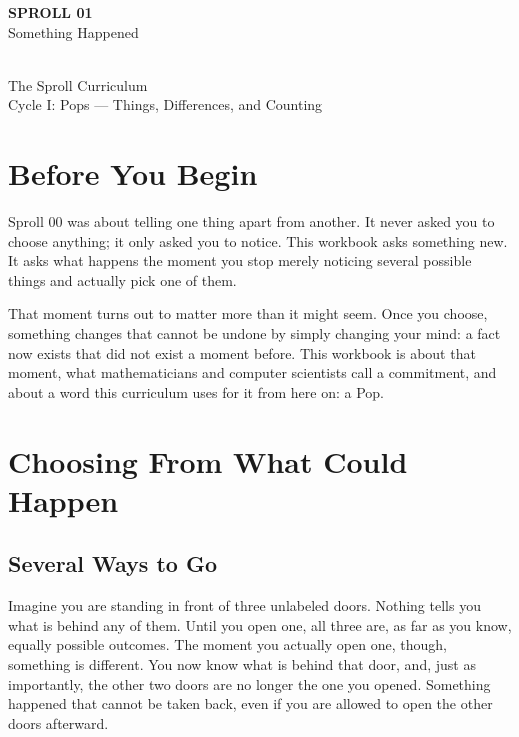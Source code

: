 \documentclass[11pt]{book}
\begin{document}
\begin{titlepage}
\centering
\vspace*{1.4in}
{\Huge \textbf{SPROLL 01}}\\[0.5in]
{\huge Something Happened}\\[0.8in]
\\[0.8in]
{\Large The Sproll Curriculum}\\[0.2in]
{\large Cycle I: Pops --- Things, Differences, and Counting}
\end{titlepage}

\tableofcontents

\chapter*{Before You Begin}

Sproll 00 was about telling one thing apart from another. It never asked you to choose anything; it only asked you to notice. This workbook asks something new. It asks what happens the moment you stop merely noticing several possible things and actually pick one of them.

That moment turns out to matter more than it might seem. Once you choose, something changes that cannot be undone by simply changing your mind: a fact now exists that did not exist a moment before. This workbook is about that moment, what mathematicians and computer scientists call a commitment, and about a word this curriculum uses for it from here on: a Pop.

\chapter{Choosing From What Could Happen}

\section{Several Ways to Go}

Imagine you are standing in front of three unlabeled doors. Nothing tells you what is behind any of them. Until you open one, all three are, as far as you know, equally possible outcomes. The moment you actually open one, though, something is different. You now know what is behind that door, and, just as importantly, the other two doors are no longer the one you opened. Something happened that cannot be taken back, even if you are allowed to open the other doors afterward.
\end{document}
